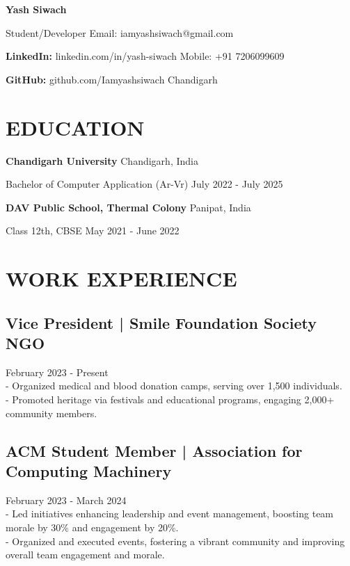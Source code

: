 \documentclass[a4paper,10pt]{article}
\begin{document}
{\Huge\textbf{Yash Siwach}}

Student/Developer \hfill Email: {iamyashsiwach@gmail.com} 

\textbf{LinkedIn:} {linkedin.com/in/yash-siwach} \hfill Mobile: +91 7206099609

\textbf{GitHub:} {github.com/Iamyashsiwach} \hfill Chandigarh
\vspace{4pt}
\section*{EDUCATION}
\vspace{8pt}
\textbf{Chandigarh University} \hfill Chandigarh, India
\smallskip

Bachelor of Computer Application (Ar-Vr) \hfill July 2022 - July 2025
\smallskip

\textbf{DAV Public School, Thermal Colony} \hfill Panipat, India
\smallskip

Class 12th, CBSE \hfill May 2021 - June 2022
\vspace{3pt}
\section*{WORK EXPERIENCE}
\vspace{8pt}
\subsection*{Vice President | Smile Foundation Society NGO} \hfill February 2023 - Present
\vspace{4pt}\\
  - Organized medical and blood donation camps, serving over 1,500 individuals.\\
  - Promoted heritage via festivals and educational programs, engaging 2,000+ community members.
\vspace{8pt}
\subsection*{ACM Student Member | Association for Computing Machinery} \hfill February 2023 - March 2024
\vspace{4pt}\\
   - Led initiatives enhancing leadership and event management, boosting team morale by 30\% and engagement by 20\%.\\
   - Organized and executed events, fostering a vibrant community and improving overall team engagement and morale.
\vspace{8pt}
\end{document}
